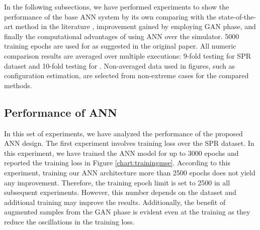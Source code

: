 \documentclass[journal]{IEEEtran}
\begin{document}
In the following subsections, we have performed experiments to show the performance of the base ANN system by its own comparing with the state-of-the-art method in the literature \cite{paper0}, improvement gained by employing GAN phase, and finally the computational advantages of using ANN over the simulator. 5000 training epochs are used for  \cite{paper0} as suggested in the original paper. All numeric comparison results are averaged over multiple executions: 9-fold testing for SPR dataset and 10-fold testing for \dszero. Non-averaged data used in figures, such as configuration estimation, are selected from non-extreme cases for the compared methods.
%
%

\subsection{Performance of ANN}

In this set of experiments, we have analyzed the performance of the proposed ANN design. The first experiment involves training loss over the SPR dataset. In this experiment, we have trained the ANN model for up to 3000 epochs and reported the training loss in Figure \ref{chart:trainingmse}. According to this experiment, training our ANN architecture more than 2500 epochs does not yield any improvement. Therefore, the training epoch limit is set to 2500 in all subsequent experiments. However, this number depends on the dataset and additional training may improve the results. Additionally, the benefit of augmented samples from the GAN phase is evident even at the training as they reduce the oscillations in the training loss.
\end{document}
